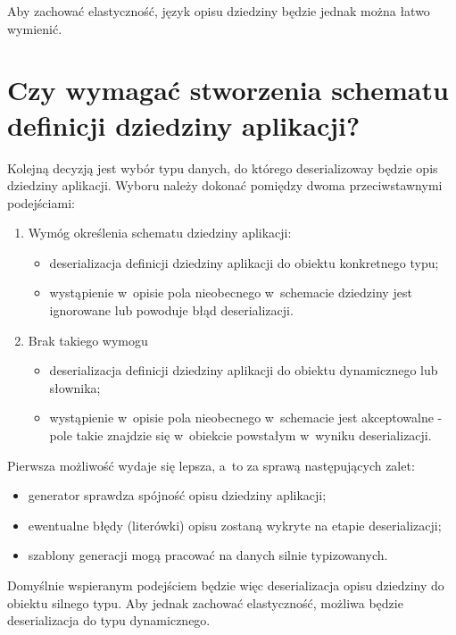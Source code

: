 Aby zachować elastyczność, język opisu dziedziny będzie jednak można łatwo wymienić.



\section{Czy wymagać stworzenia schematu definicji dziedziny aplikacji?} \label{sec:core:domain_schema_requirement}

Kolejną decyzją jest wybór typu danych, do którego deserializoway będzie opis dziedziny aplikacji.
Wyboru należy dokonać pomiędzy dwoma przeciwstawnymi podejściami:

\begin{enumerate}
 \item Wymóg określenia schematu dziedziny aplikacji:
  \begin{itemize}
   \item deserializacja definicji dziedziny aplikacji do obiektu konkretnego typu;
   \item wystąpienie w~opisie pola nieobecnego w~schemacie dziedziny jest ignorowane lub powoduje błąd deserializacji.
  \end{itemize}
 \item Brak takiego wymogu
  \begin{itemize}
   \item deserializacja definicji dziedziny aplikacji do obiektu dynamicznego lub słownika;
   \item wystąpienie w~opisie pola nieobecnego w~schemacie jest akceptowalne - pole takie znajdzie się w~obiekcie powstałym w~wyniku deserializacji.
  \end{itemize}

\end{enumerate}

Pierwsza możliwość wydaje się lepsza, a~to za sprawą następujących zalet:

\begin{itemize}
 \item generator sprawdza spójność opisu dziedziny aplikacji;
 \item ewentualne błędy (literówki) opisu zostaną wykryte na etapie deserializacji;
 \item szablony generacji mogą pracować na danych silnie typizowanych.
\end{itemize}

Domyślnie wspieranym podejściem będzie więc deserializacja opisu dziedziny do obiektu silnego typu.
Aby jednak zachować elastyczność, możliwa będzie deserializacja do typu dynamicznego.



